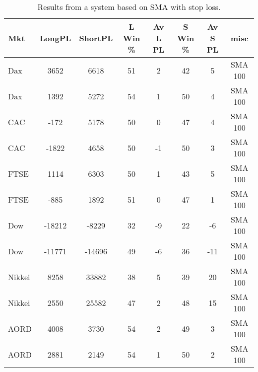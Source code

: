 \begin{table}[ht]
\centering
\caption[Results from a system based on SMA with stop loss]{Results from a system based on SMA with stop loss.} 
\label{tab:sma_results_Sloss}
\begin{tabular}{lccccccc}
  \toprule Mkt & LongPL & ShortPL & L Win \% & Av L PL & S Win \% & Av S PL & misc \\ 
  \midrule Dax & 3652 & 6618 & 51 & 2 & 42 & 5 & SMA 100 \\ 
  Dax & 1392 & 5272 & 54 & 1 & 50 & 4 & SMA 100 \\ 
  CAC & -172 & 5178 & 50 & 0 & 47 & 4 & SMA 100 \\ 
  CAC & -1822 & 4658 & 50 & -1 & 50 & 3 & SMA 100 \\ 
  FTSE & 1114 & 6303 & 50 & 1 & 43 & 5 & SMA 100 \\ 
  FTSE & -885 & 1892 & 51 & 0 & 47 & 1 & SMA 100 \\ 
  Dow & -18212 & -8229 & 32 & -9 & 22 & -6 & SMA 100 \\ 
  Dow & -11771 & -14696 & 49 & -6 & 36 & -11 & SMA 100 \\ 
  Nikkei & 8258 & 33882 & 38 & 5 & 39 & 20 & SMA 100 \\ 
  Nikkei & 2550 & 25582 & 47 & 2 & 48 & 15 & SMA 100 \\ 
  AORD & 4008 & 3730 & 54 & 2 & 49 & 3 & SMA 100 \\ 
  AORD & 2881 & 2149 & 54 & 1 & 50 & 2 & SMA 100 \\ 
   \bottomrule \end{tabular}
\end{table}
